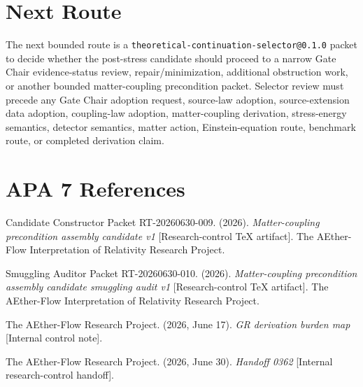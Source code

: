 \documentclass[11pt]{article}
\begin{document}
\section{Next Route}

The next bounded route is a \texttt{theoretical-continuation-selector@0.1.0}
packet to decide whether the post-stress candidate should proceed to a narrow
Gate Chair evidence-status review, repair/minimization, additional
obstruction work, or another bounded matter-coupling precondition packet.
Selector review must precede any Gate Chair adoption request, source-law
adoption, source-extension data adoption, coupling-law adoption,
matter-coupling derivation, stress-energy semantics, detector semantics,
matter action, Einstein-equation route, benchmark route, or completed
derivation claim.

\section{APA 7 References}

Candidate Constructor Packet RT-20260630-009. (2026). \emph{Matter-coupling
precondition assembly candidate v1} [Research-control TeX artifact]. The
AEther-Flow Interpretation of Relativity Research Project.

Smuggling Auditor Packet RT-20260630-010. (2026). \emph{Matter-coupling
precondition assembly candidate smuggling audit v1} [Research-control TeX
artifact]. The AEther-Flow Interpretation of Relativity Research Project.

The AEther-Flow Research Project. (2026, June 17). \emph{GR derivation burden
map} [Internal control note].

The AEther-Flow Research Project. (2026, June 30). \emph{Handoff 0362}
[Internal research-control handoff].
\end{document}
